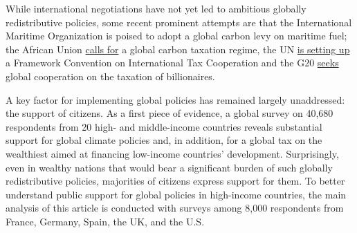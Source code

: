 While international negotiations have not yet led to ambitious globally redistributive policies, %
some recent prominent attempts are that the International Maritime Organization is poised to adopt a global carbon levy on maritime fuel; the 
African Union \href{https://media.africaclimatesummit.org/NAIROBI+Declaration+FURTHER+edited+060923+EN+920AM.pdf}{calls for} a global carbon taxation regime, %
the UN \href{https://digitallibrary.un.org/record/4032838}{is setting up} a Framework Convention on International Tax Cooperation and  %
the G20 \href{https://www.gov.br/fazenda/pt-br/assuntos/g20/declaracoes/1-g20-ministerial-declaration-international-taxation-cooperation.pdf}{seeks} global cooperation on the taxation of billionaires. %

A key factor for implementing global policies has remained largely unaddressed: the support of citizens. As a first piece of evidence, a global survey on 40,680 respondents from 20 high- and middle-income countries reveals substantial support for global climate policies and, in addition, for a global tax on the wealthiest aimed at financing low-income countries' development. Surprisingly, even in wealthy nations that would bear a significant burden of such globally redistributive policies, majorities of citizens express support for them. To better understand public support for global policies in high-income countries, the  main analysis of this article is conducted with surveys among 8,000 respondents from France, Germany, Spain, the UK, and the U.S. 

